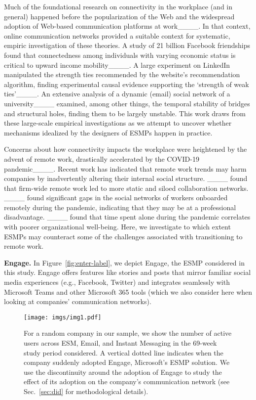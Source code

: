 Much of the foundational research on connectivity in the workplace (and in general) happened before the popularization of the Web and the widespread adoption of Web-based communication platforms at work____. In that context, online communication networks provided a suitable context for systematic, empiric investigation of these theories.
A study of 21 billion Facebook friendships found that connectedness among individuals with varying economic status is critical to upward income mobility____.
A large experiment on LinkedIn manipulated the strength ties recommended by the website's recommendation algorithm, finding experimental causal evidence
supporting the `strength of weak ties'____.
An extensive analysis of a dynamic (email) social network of a university____ examined, among other things, the temporal stability of bridges and structural holes, finding them to be largely unstable.
This work draws from these large-scale empirical investigations as we attempt to uncover whether mechanisms idealized by the designers of ESMPs happen in practice.

Concerns about how connectivity impacts the workplace were heightened by the advent of remote work, drastically accelerated by the COVID-19 pandemic____.
Recent work has indicated that remote work trends may harm companies by inadvertently altering their internal social structure.
____ found that firm-wide remote work led to more static and siloed collaboration networks.
____ found significant gaps in the social networks of workers onboarded remotely during the pandemic, indicating that they may be at a professional disadvantage.
____ found that time spent alone during the pandemic correlates with poorer organizational well-being.
Here, we investigate to which extent ESMPs may counteract some of the challenges associated with transitioning to remote work.

\vspace{0.5mm}
\noindent
\textbf{Engage.} In Figure~\ref{fig:enter-label}, we depict Engage, the ESMP considered in this study. Engage offers features like stories and posts that mirror familiar social media experiences (e.g., Facebook, Twitter) and integrates seamlessly with Microsoft Teams and other Microsoft 365 tools (which we also consider here when looking at companies' communication networks).

\begin{figure}[t]
    \centering
    \texttt{[image: imgs/img1.pdf]}
    \caption{For a random company in our sample, we show the number of active users across ESM, Email, and Instant Messaging in the 69-week study period considered. A vertical dotted line indicates when the company suddenly adopted Engage, Microsoft's ESMP solution. We use the discontinuity around the adoption of Engage to study the effect of its adoption on the company's communication network (see Sec.~\ref{sec:did} for methodological details).}
    \label{fig:breakingpoint_example}
\end{figure}